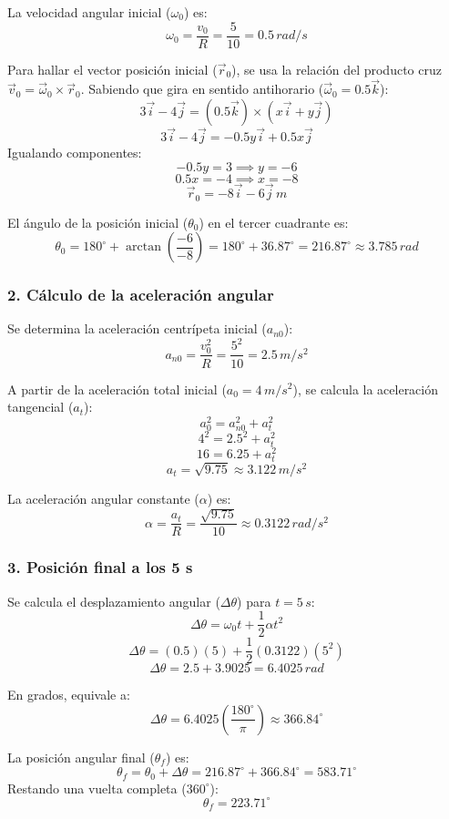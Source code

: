 \documentclass[12pt, a4paper]{article}
\begin{document}
La velocidad angular inicial ($\omega_0$) es:
$$ \omega_0 = \frac{v_0}{R} = \frac{5}{10} = 0.5 \, \si{rad/s} $$

Para hallar el vector posición inicial ($\vec{r}_0$), se usa la relación del producto cruz $\vec{v}_0 = \vec{\omega}_0 \times \vec{r}_0$. Sabiendo que gira en sentido antihorario ($\vec{\omega}_0 = 0.5\vec{k}$):
$$ 3\vec{i} - 4\vec{j} = (0.5\vec{k}) \times (x\vec{i} + y\vec{j}) $$
$$ 3\vec{i} - 4\vec{j} = -0.5y\vec{i} + 0.5x\vec{j} $$
Igualando componentes:
$$ -0.5y = 3 \implies y = -6 $$
$$ 0.5x = -4 \implies x = -8 $$
$$ \vec{r}_0 = -8\vec{i} - 6\vec{j} \, \si{m} $$

El ángulo de la posición inicial ($\theta_0$) en el tercer cuadrante es:
$$ \theta_0 = 180^\circ + \arctan\left(\frac{-6}{-8}\right) = 180^\circ + 36.87^\circ = 216.87^\circ \approx 3.785 \, \si{rad} $$

\subsubsection*{2. Cálculo de la aceleración angular}
Se determina la aceleración centrípeta inicial ($a_{n0}$):
$$ a_{n0} = \frac{v_0^2}{R} = \frac{5^2}{10} = 2.5 \, \si{m/s^2} $$

A partir de la aceleración total inicial ($a_0 = 4 \, \si{m/s^2}$), se calcula la aceleración tangencial ($a_t$):
$$ a_0^2 = a_{n0}^2 + a_t^2 $$
$$ 4^2 = 2.5^2 + a_t^2 $$
$$ 16 = 6.25 + a_t^2 $$
$$ a_t = \sqrt{9.75} \approx 3.122 \, \si{m/s^2} $$

La aceleración angular constante ($\alpha$) es:
$$ \alpha = \frac{a_t}{R} = \frac{\sqrt{9.75}}{10} \approx 0.3122 \, \si{rad/s^2} $$

\subsubsection*{3. Posición final a los 5 s}
Se calcula el desplazamiento angular ($\Delta\theta$) para $t = 5 \, \si{s}$:
$$ \Delta\theta = \omega_0 t + \frac{1}{2}\alpha t^2 $$
$$ \Delta\theta = (0.5)(5) + \frac{1}{2}(0.3122)(5^2) $$
$$ \Delta\theta = 2.5 + 3.9025 = 6.4025 \, \si{rad} $$

En grados, equivale a:
$$ \Delta\theta = 6.4025 \left(\frac{180^\circ}{\pi}\right) \approx 366.84^\circ $$

La posición angular final ($\theta_f$) es:
$$ \theta_f = \theta_0 + \Delta\theta = 216.87^\circ + 366.84^\circ = 583.71^\circ $$
Restando una vuelta completa ($360^\circ$):
$$ \theta_f = 223.71^\circ $$
\end{document}
